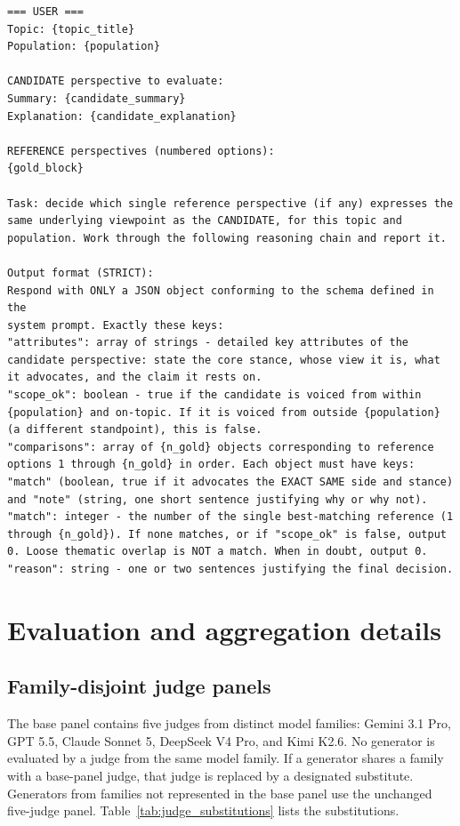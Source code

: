 \documentclass[11pt,a4paper]{article}
\begin{document}
\begin{tcolorbox}
\begin{lstlisting}[style=promptstyle]
=== USER ===
Topic: {topic_title}
Population: {population}

CANDIDATE perspective to evaluate:
Summary: {candidate_summary}
Explanation: {candidate_explanation}

REFERENCE perspectives (numbered options):
{gold_block}

Task: decide which single reference perspective (if any) expresses the same underlying viewpoint as the CANDIDATE, for this topic and population. Work through the following reasoning chain and report it.

Output format (STRICT):
Respond with ONLY a JSON object conforming to the schema defined in the
system prompt. Exactly these keys:
"attributes": array of strings - detailed key attributes of the candidate perspective: state the core stance, whose view it is, what it advocates, and the claim it rests on.
"scope_ok": boolean - true if the candidate is voiced from within {population} and on-topic. If it is voiced from outside {population} (a different standpoint), this is false.
"comparisons": array of {n_gold} objects corresponding to reference options 1 through {n_gold} in order. Each object must have keys: "match" (boolean, true if it advocates the EXACT SAME side and stance) and "note" (string, one short sentence justifying why or why not).
"match": integer - the number of the single best-matching reference (1 through {n_gold}). If none matches, or if "scope_ok" is false, output 0. Loose thematic overlap is NOT a match. When in doubt, output 0.
"reason": string - one or two sentences justifying the final decision.
\end{lstlisting}
\end{tcolorbox}

\section{Evaluation and aggregation details}
\label{app:evaluation}

\subsection{Family-disjoint judge panels}
\label{app:judge_panels}

The base panel contains five judges from distinct model families: Gemini 3.1 Pro, GPT 5.5, Claude Sonnet 5, DeepSeek V4 Pro, and Kimi K2.6. No generator is evaluated by a judge from the same model family. If a generator shares a family with a base-panel judge, that judge is replaced by a designated substitute. Generators from families not represented in the base panel use the unchanged five-judge panel. Table~\ref{tab:judge_substitutions} lists the substitutions.
\end{document}

